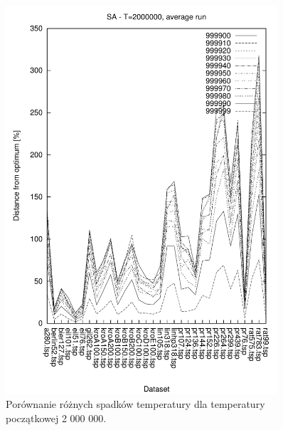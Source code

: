 \begin{figure}
\begin{center}
\includegraphics[width=0.9\textwidth]{wykresy/sa/sa_2000000_av}
\end{center}
\caption{Porównanie różnych spadków temperatury dla temperatury początkowej 2 000 000.}
\label{sa_2000000_av}
\end{figure}
